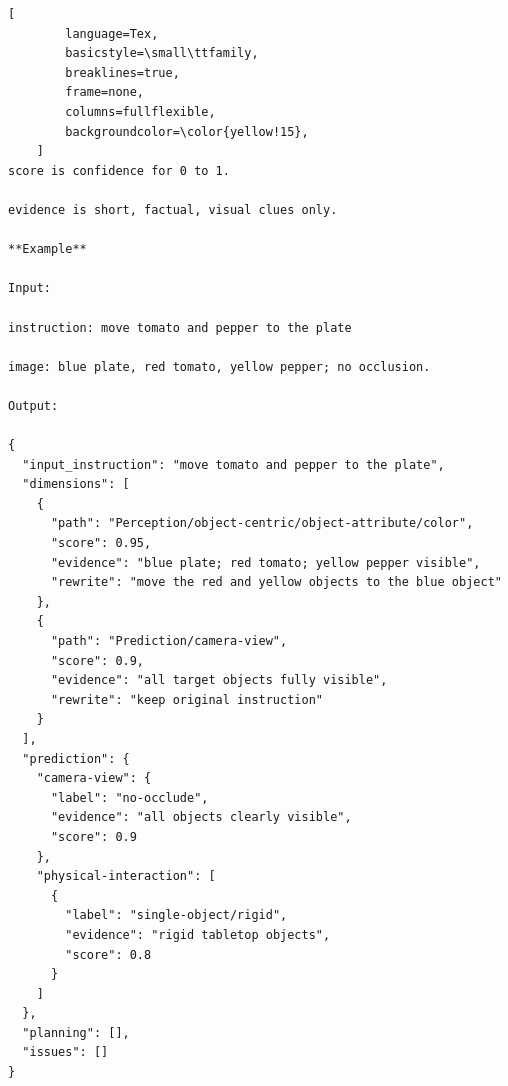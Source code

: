 \begin{tcolorbox}[
    promptstyle, 
    width=\linewidth, 
    breakable
]
\begin{lstlisting}[
        language=Tex, 
        basicstyle=\small\ttfamily,
        breaklines=true,
        frame=none, 
        columns=fullflexible,
        backgroundcolor=\color{yellow!15}, 
    ]
score is confidence for 0 to 1.

evidence is short, factual, visual clues only.

**Example**

Input:

instruction: move tomato and pepper to the plate

image: blue plate, red tomato, yellow pepper; no occlusion.

Output:

{
  "input_instruction": "move tomato and pepper to the plate",
  "dimensions": [
    {
      "path": "Perception/object-centric/object-attribute/color",
      "score": 0.95,
      "evidence": "blue plate; red tomato; yellow pepper visible",
      "rewrite": "move the red and yellow objects to the blue object"
    },
    {
      "path": "Prediction/camera-view",
      "score": 0.9,
      "evidence": "all target objects fully visible",
      "rewrite": "keep original instruction"
    }
  ],
  "prediction": {
    "camera-view": {
      "label": "no-occlude",
      "evidence": "all objects clearly visible",
      "score": 0.9
    },
    "physical-interaction": [
      {
        "label": "single-object/rigid",
        "evidence": "rigid tabletop objects",
        "score": 0.8
      }
    ]
  },
  "planning": [],
  "issues": []
}
    \end{lstlisting}
    
\end{tcolorbox}

\centering

